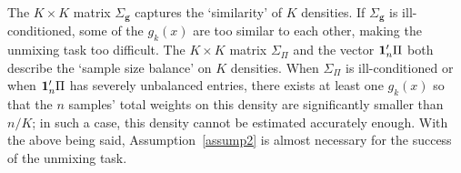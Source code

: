 \documentclass[preprint,11pt]{article}
\newtheorem{assumption}{Assumption}
\newcommand{\mcal}{\mathcal}
\numberwithin{equation}{section}
\newcommand{\beq}{\begin{equation}}
\newcommand{\eeq}{\end{equation}}
\begin{document}

The $K\times K$ matrix $\Sigma_{\boldsymbol g}$ captures the `similarity' of $K$ densities. 
If $\Sigma_{\boldsymbol g}$ is ill-conditioned, some of the $g_k(x)$ are too similar to each other, making the unmixing task too difficult. 
The $K\times K$ matrix $\Sigma_\Pi$ and the vector ${\bf 1}_n'\Pi$ both describe the `sample size balance' on $K$ densities. When $\Sigma_\Pi$ is ill-conditioned or when ${\bf 1}_n'\Pi$ has severely unbalanced entries, there exists at least one $g_k(x)$ so that the $n$ samples' total weights on this density are significantly smaller than $n/K$; in such a case, this density cannot be estimated accurately enough. With the above being said, Assumption~\ref{assump2} is almost necessary for the success of the unmixing task. 
\end{document}
